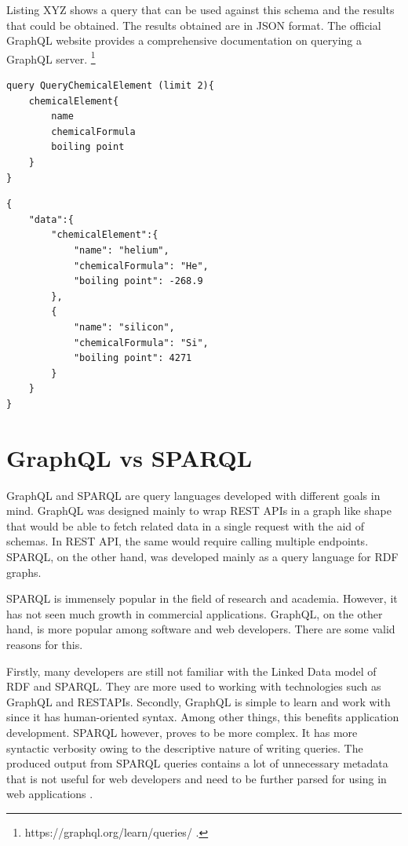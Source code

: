 Listing XYZ shows a query that can be used against this schema and the results that could be obtained. The results obtained are in JSON format. The official GraphQL website provides a comprehensive documentation on querying a GraphQL server. \footnote{ https://graphql.org/learn/queries/ .} 

\begin{minipage}{\linewidth}
\begin{lstlisting}[label=listing:listing5, caption={Query to fetch chemical elements and their properties}]
query QueryChemicalElement (limit 2){
    chemicalElement{
		name
		chemicalFormula
		boiling point
	}
}
\end{lstlisting}
\end{minipage}

\begin{minipage}{\linewidth}
\begin{lstlisting}[label=listing:listing5, caption={Query to fetch chemical elements and their properties}]
{
	"data":{
		"chemicalElement":{
			"name": "helium",
			"chemicalFormula": "He",
			"boiling point": -268.9
		},
		{	
			"name": "silicon",
			"chemicalFormula": "Si",
			"boiling point": 4271
		}
	}
}

\end{lstlisting}
\end{minipage}

\section{GraphQL vs SPARQL}

GraphQL and SPARQL are query languages developed with different goals in mind. GraphQL was designed mainly to wrap REST APIs in a graph like shape that would be able to fetch related data in a single request with the aid of schemas. In REST API, the same would require calling multiple endpoints. SPARQL, on the other hand, was developed mainly as a query language for RDF graphs.

SPARQL is immensely popular in the field of research and academia. However, it has not seen much growth in commercial applications. GraphQL, on the other hand, is more popular among software and web developers. There are some valid reasons for this.  

Firstly, many developers are still not familiar with the Linked Data model of RDF and SPARQL. They are more used to working with technologies such as GraphQL and RESTAPIs. Secondly, GraphQL is simple to learn and work with since it has human-oriented syntax. Among other things, this benefits application development. SPARQL however, proves to be more complex. It has more syntactic verbosity owing to the descriptive nature of writing queries. The produced output from SPARQL queries contains a lot of unnecessary metadata that is not useful for web developers and need to be further parsed for using in web applications \cite{Lisena2018}. 

